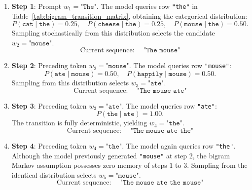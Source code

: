 \documentclass[../../main.tex]{subfiles}
\begin{document}
\begin{enumerate}
    \item \textbf{Step 1}: Prompt $w_1 = \texttt{"The"}$. The model queries row \texttt{"the"} in Table~\ref{tab:bigram_transition_matrix}, obtaining the categorical distribution:
    \begin{equation}
    P\left(\texttt{cat} \mid \texttt{the}\right) = 0.25, \quad P\left(\texttt{cheese} \mid \texttt{the}\right) = 0.25, \quad P\left(\texttt{mouse} \mid \texttt{the}\right) = 0.50.
    \end{equation}
    Sampling stochastically from this distribution selects the candidate $w_2 = \texttt{"mouse"}$.
    \begin{equation}
    \text{Current sequence: } \quad \texttt{"The mouse"}
    \end{equation}

    \item \textbf{Step 2}: Preceding token $w_2 = \texttt{"mouse"}$. The model queries row \texttt{"mouse"}:
    \begin{equation}
    P\left(\texttt{ate} \mid \texttt{mouse}\right) = 0.50, \quad P\left(\texttt{happily} \mid \texttt{mouse}\right) = 0.50.
    \end{equation}
    Sampling from this distribution selects $w_3 = \texttt{"ate"}$.
    \begin{equation}
    \text{Current sequence: } \quad \texttt{"The mouse ate"}
    \end{equation}

    \item \textbf{Step 3}: Preceding token $w_3 = \texttt{"ate"}$. The model queries row \texttt{"ate"}:
    \begin{equation}
    P\left(\texttt{the} \mid \texttt{ate}\right) = 1.00.
    \end{equation}
    The transition is fully deterministic, yielding $w_4 = \texttt{"the"}$.
    \begin{equation}
    \text{Current sequence: } \quad \texttt{"The mouse ate the"}
    \end{equation}

    \item \textbf{Step 4}: Preceding token $w_4 = \texttt{"the"}$. The model again queries row \texttt{"the"}. Although the model previously generated \texttt{"mouse"} at step 2, the bigram Markov assumption possesses zero memory of steps $1$ to $3$. Sampling from the identical distribution selects $w_5 = \texttt{"mouse"}$.
    \begin{equation}
    \text{Current sequence: } \quad \texttt{"The mouse ate the mouse"}
    \end{equation}


\end{enumerate}
\end{document}
